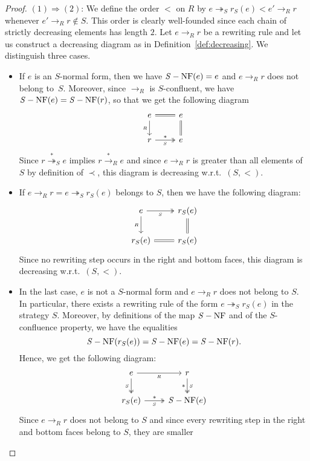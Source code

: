 \documentclass[10pt]{easychair}
\theoremstyle{definition}
\newcommand\rewR{\to_R}
\newcommand\rewS{\twoheadrightarrow_S}
\newcommand\transR{\overset{*}{\to}_R}
\newcommand\transS{\overset{*}{\twoheadrightarrow}_S}
\DeclareMathOperator{\SNF}{{\it S}-NF}
\begin{document}
\begin{proof}
  $(1)\Rightarrow (2)$: We define the order $<$ on $R$ by
  $e\rewS r_S(e)<e'\rewR r$ whenever $e'\rewR r\notin S$. This order is
  clearly well-founded since each chain of strictly decreasing elements
  has length $2$. Let $e\rewR r$ be a rewriting rule and let us construct
  a decreasing diagram as in Definition~\ref{def:decreasing}. We
  distinguish three cases.
  \begin{itemize}
  \item If $e$ is an $S$-normal form, then we have $\SNF(e)=e$ and
    $e\rewR r$ does not belong to~$S$. Moreover, since $\rewR$ is
    $S$-confluent, we have $\SNF(e)=\SNF(r)$, so that we get the
    following diagram
    \[\begin{tikzcd}
    e\ar[d, "_R"']\ar[r, equal] &
    e\ar[d, equal]\\
    r\ar[r, twoheadrightarrow, "*", "_S"'] & e
    \end{tikzcd}\]
    Since $r\transS e$ implies $r\transR e$ and since $e\rewR r$ is greater
    than all elements of $S$ by definition of $\prec$, this diagram is
    decreasing w.r.t.\ $(S,<)$.
  \item If $e\rewR r=e\rewS r_S(e)$ belongs to $S$, then we have the 
    following diagram:
    \[\begin{tikzcd}
    e\ar[r, twoheadrightarrow, "_S"']\ar[d, "_R"']
    & r_S(e) \ar[equal, d]\\
    r_S(e)\ar[r, equal] & r_S(e)
    \end{tikzcd}\]
    Since no rewriting step occurs in the right and bottom faces, this
    diagram is decreasing w.r.t.\ $(S,<)$.
  \item In the last case, $e$ is not a $S$-normal form and $e\rewR r$
    does not belong to $S$. In particular, there exists a rewriting rule
    of the form $e\rewS r_S(e)$ in the strategy $S$. Moreover, by
    definitions of the map $\SNF$ and of the $S$-confluence property, we
    have the equalities
    \[\SNF(r_S(e))=\SNF(e)=\SNF(r).
    \smallskip\]
    Hence, we get the following diagram:
    \[\begin{tikzcd}
    e\ar[r, "_R"']\ar[d, twoheadrightarrow, "_S"'] &
    r \ar[twoheadrightarrow, , "_S", "*"', d] \\
    r_S(e) \ar[r, twoheadrightarrow, "_S"', "*"] & \SNF (e)
    \end{tikzcd}\]
    Since $e\rewR r$ does not belong to $S$ and since every rewriting
    step in the right and bottom faces belong to $S$, they are smaller

\end{itemize}
\end{proof}
\end{document}
